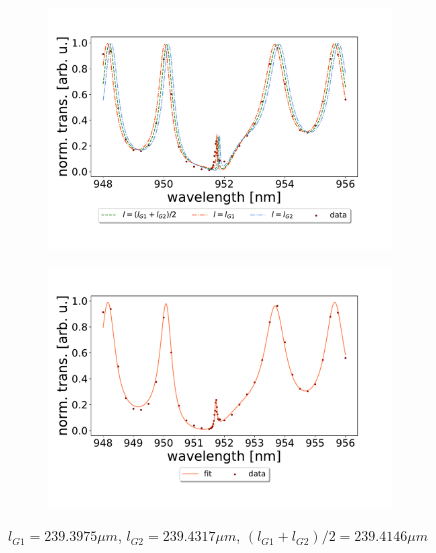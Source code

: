 \begin{figure}[h!]
    \centering
    \begin{subfigure}[b]{0.49\textwidth}
        \centering
        \includegraphics[width=\textwidth]{figures/results/238um_long_scan_sim_comparison.pdf}
        \caption{}
        \label{fig:238um_long_scan_sim_comparison}
    \end{subfigure}
    \begin{subfigure}[b]{0.49\textwidth}
        \centering
        \includegraphics[width=\textwidth]{figures/results/238um_long_scan_fit.pdf}
        \caption{}
        \label{fig:238um_long_scan_fit}
    \end{subfigure}
    \caption{$l_{G1} = 239.3975 \mu m$, $l_{G2} = 239.4317 \mu m$, $(l_{G1} + l_{G2})/2 = 239.4146 \mu m$}
    \label{fig:238um_cavity_fit_and_sim}
\end{figure}

